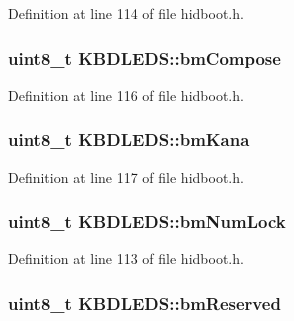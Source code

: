 \-Definition at line 114 of file hidboot.\-h.

\hypertarget{struct_k_b_d_l_e_d_s_a4a427e795e68a0f21a9f1fd919f301b7}{
\subsubsection[{bm\-Compose}]{\setlength{\rightskip}{0pt plus 5cm}uint8\-\_\-t {\bf \-K\-B\-D\-L\-E\-D\-S\-::bm\-Compose}}}\label{struct_k_b_d_l_e_d_s_a4a427e795e68a0f21a9f1fd919f301b7}


\-Definition at line 116 of file hidboot.\-h.

\hypertarget{struct_k_b_d_l_e_d_s_ab5ade03a9898e281a7bb639277460f53}{
\subsubsection[{bm\-Kana}]{\setlength{\rightskip}{0pt plus 5cm}uint8\-\_\-t {\bf \-K\-B\-D\-L\-E\-D\-S\-::bm\-Kana}}}\label{struct_k_b_d_l_e_d_s_ab5ade03a9898e281a7bb639277460f53}


\-Definition at line 117 of file hidboot.\-h.

\hypertarget{struct_k_b_d_l_e_d_s_a3885cc62f7ab3f3f450814d05204d1b3}{
\subsubsection[{bm\-Num\-Lock}]{\setlength{\rightskip}{0pt plus 5cm}uint8\-\_\-t {\bf \-K\-B\-D\-L\-E\-D\-S\-::bm\-Num\-Lock}}}\label{struct_k_b_d_l_e_d_s_a3885cc62f7ab3f3f450814d05204d1b3}


\-Definition at line 113 of file hidboot.\-h.

\hypertarget{struct_k_b_d_l_e_d_s_a92e26041dea84520a006a83a795c8071}{
\subsubsection[{bm\-Reserved}]{\setlength{\rightskip}{0pt plus 5cm}uint8\-\_\-t {\bf \-K\-B\-D\-L\-E\-D\-S\-::bm\-Reserved}}}\label{struct_k_b_d_l_e_d_s_a92e26041dea84520a006a83a795c8071}


